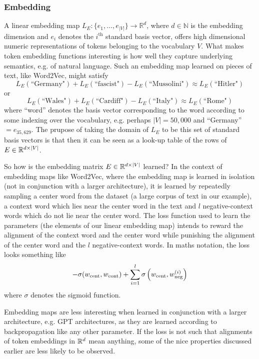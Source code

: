 \documentclass[11pt]{article}
\begin{document}
\subsubsection{Embedding}
A linear embedding map $L_E:\{e_1,\dots,e_{|V|}\}\to\mathbb{R}^d$, where $d\in\mathbb{N}$ is the embedding dimension and $e_i$ denotes the $i^{\text{th}}$ standard basis vector, offers high dimensional numeric representations of tokens belonging to the vocabulary $V$. What makes token embedding functions interesting is how well they capture underlying semantics, e.g. of natural language. Such an embedding map learned on pieces of text, like Word2Vec, might satisfy
$$
L_E(\text{``Germany"})+L_E(\text{``fascist"})-L_E(\text{``Mussolini"})
\approx
L_E(\text{``Hitler"})
$$
or
$$
L_E(\text{``Wales"})+L_E(\text{``Cardiff"})-L_E(\text{``Italy"})
\approx
L_E(\text{``Rome"})
$$
where ``word'' denotes the basis vector corresponding to the word according to some indexing over the vocabulary, e.g. perhaps $|V|=50,000$ and ``Germany''$=e_{35,629}$. The prupose of taking the domain of $L_E$ to be this set of standard basis vectors is that then it can be seen as a look-up table of the rows of $E\in\mathbb{R}^{d\times|V|}$.

So how is the embedding matrix $E\in\mathbb{R}^{d\times |V|}$ learned? In the context of embedding maps like Word2Vec, where the embedding map is learned in isolation (not in conjunction with a larger architecture), it is learned by repeatedly sampling a center word from the dataset (a large corpus of text in our example), a context word which lies near the center word in the text and $l$ negative-context words which do not lie near the center word. The loss function used to learn the parameters (the elements of our linear embedding map) intends to reward the alignment of the context word and the center word while punishing the alignment of the center word and the $l$ negative-context words. In maths notation, the loss looks something like
$$
-\sigma(w_{\text{cent}}, w_{\text{cont}}) + \sum_{i=1}^l\sigma\left(w_{\text{cent}}, w_{\text{neg}}^{(i)}\right)
$$
where $\sigma$ denotes the sigmoid function.

Embedding maps are less interesting when learned in conjunction with a larger architecture, e.g. GPT architectures, as they are learned according to backpropagation like any other parameter. If the loss is not such that alignments of token embeddings in $\mathbb{R}^d$ mean anything, some of the nice properties discussed earlier are less likely to be observed.
\end{document}
